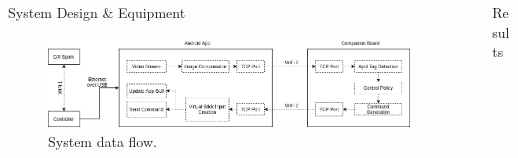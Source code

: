 \documentclass[final, 20pt]{beamer}
\newlength{\sepwidth}
\newlength{\colwidth}
\newcommand{\separatorcolumn}{\begin{column}{\sepwidth}\end{column}}
\begin{document}
\begin{frame}[t]
\begin{columns}[t]
\begin{column}{\colwidth}
\begin{alertblock}{System Design \& Equipment}
    \lipsum[10]

    \begin{figure}
      \centering
      \includegraphics[width=\linewidth]{images/spark_architecture.drawio}
      \caption{System data flow.}
    \end{figure}

    \lipsum[15]

  \end{alertblock}

%
%

\end{column}

\separatorcolumn

\begin{column}{\colwidth}

  \begin{alertblock}{Results}


\end{alertblock}
\end{column}
\end{columns}
\end{frame}
\end{document}
